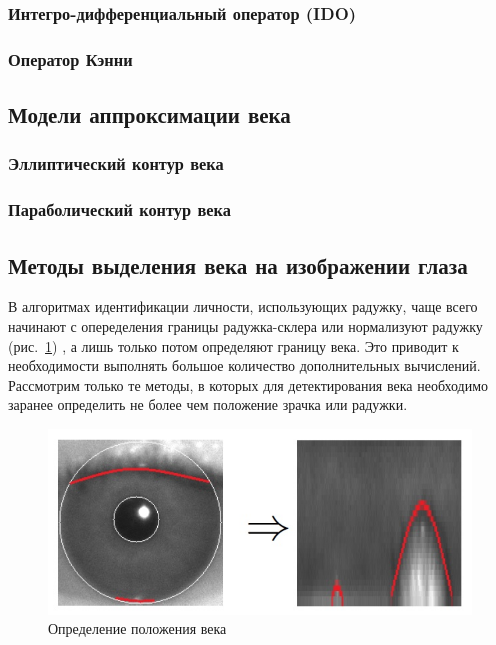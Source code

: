 \documentclass[12pt]{article} %
\begin{document}
\subsubsection{Интегро-дифференциальный оператор (IDO)}
\subsubsection{Оператор Кэнни}

\newpage

\subsection{Модели аппроксимации века}

\subsubsection{Эллиптический контур века}

\subsubsection{Параболический контур века}

\newpage
\subsection{Методы выделения века на изображении глаза}

В алгоритмах идентификации личности, использующих радужку, чаще всего начинают с опеределения границы радужка-склера \cite{Adam_1, Daugman, Matv} или нормализуют радужку (рис.~\ref{fig:glaz3}) \cite{Min}, а лишь только потом определяют границу века. Это приводит к необходимости выполнять большое количество дополнительных вычислений. Рассмотрим только те методы, в которых для детектирования века необходимо заранее определить не более чем положение зрачка или радужки.

\begin{figure}[h]
	
	\centering
	
	\includegraphics[width=0.8\linewidth]{glaz3.jpg}
	
	\caption{Определение положения века}
	
	\label{fig:glaz3}
	
\end{figure}
\end{document}
